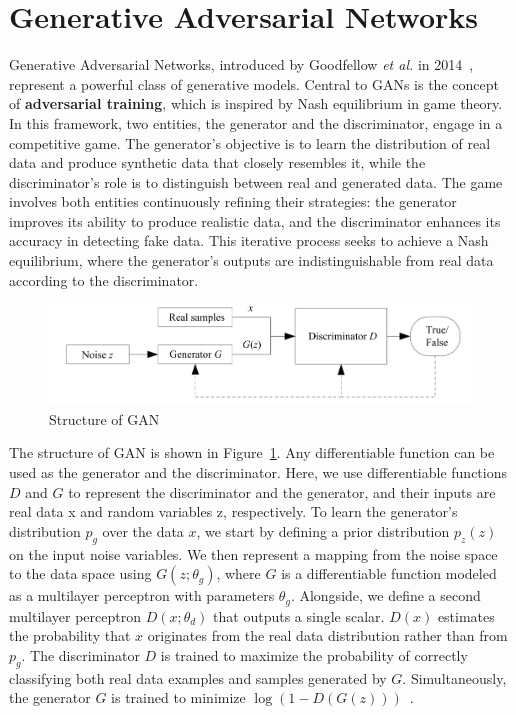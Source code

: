 \documentclass[12pt,DIV14,BCOR12mm,a4paper,footinclude=false,headinclude,parskip=half-,twoside,openright,cleardoublepage=empty,toc=index,bibliography=totoc,listof=totoc]{scrreprt}
\numberwithin{equation}{chapter}
\begin{document}
\section{Generative Adversarial Networks}
\label{sec:GANs_theory}
Generative Adversarial Networks, introduced by Goodfellow \textit{et al.} in 2014~\cite{goodfellow2014generative}, represent a powerful class of generative models. Central to GANs is the concept of \textbf{adversarial training}, which is inspired by Nash equilibrium in game theory. In this framework, two entities, the generator and the discriminator, engage in a competitive game. The generator's objective is to learn the distribution of real data and produce synthetic data that closely resembles it, while the discriminator's role is to distinguish between real and generated data. The game involves both entities continuously refining their strategies: the generator improves its ability to produce realistic data, and the discriminator enhances its accuracy in detecting fake data. This iterative process seeks to achieve a Nash equilibrium, where the generator's outputs are indistinguishable from real data according to the discriminator.
\begin{figure}
	\centering
	\includegraphics[scale=0.7]{../media/structure of GAN1.PNG}
	\caption{Structure of GAN~\cite{wang2017generative}}
	\label{GAN_struct}
\end{figure}
The structure of GAN is shown in Figure~\ref{GAN_struct}. Any differentiable function can be used as the generator and the discriminator. Here, we use differentiable functions \( D \) and \( G \) to represent the discriminator and the generator, and their inputs are real data x and random variables z, respectively. To learn the generator's distribution \( p_g\) over the data \( x \), we start by defining a prior distribution \( p_z(z) \) on the input noise variables. We then represent a mapping from the noise space to the data space using \( G(z; \theta_g) \), where \( G \) is a differentiable function modeled as a multilayer perceptron with parameters \( \theta_g \). Alongside, we define a second multilayer perceptron \( D(x; \theta_d) \) that outputs a single scalar. \( D(x) \) estimates the probability that \( x \) originates from the real data distribution rather than from \( p_g \). The discriminator \( D \) is trained to maximize the probability of correctly classifying both real data examples and samples generated by \( G \). Simultaneously, the generator \( G \) is trained to minimize \( \log(1 - D(G(z))) \)~\cite{wang2017generative}. 
\end{document}
